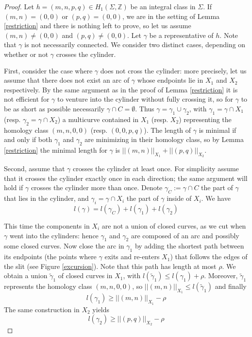 \documentclass{article}
\newcommand{\ZZ}{\mathbb{Z}}
\theoremstyle{definition}
\begin{document}
\begin{proof}
Let $h=(m,n,p,q)\in H_1(\Sigma,\ZZ)$ be an integral class in $\Sigma$. If $(m,n)=(0,0)$ or $(p,q)=(0,0)$, we are in the setting of Lemma \ref{restriction} and there is nothing left to prove, so let us assume $(m,n)\ne (0,0)$ and $(p,q)\ne (0,0)$. Let $\gamma$ be a representative of $h$. Note that $\gamma$ is not necessarily connected. We consider two distinct cases, depending on whether or not $\gamma$ crosses the cylinder. \newline \newline

First, consider the case where $\gamma$ does not cross the cylinder: more precisely, let us assume that there does not exist an arc of $\gamma$ whose endpoints lie in $X_1$ and $X_2$ respectively. By the same argument as in the proof of Lemma \ref{restriction} it is not efficient for $\gamma$ to venture into the cylinder without fully crossing it, so for $\gamma$ to be as short as possible necessarily $\gamma \cap C = \emptyset$. Thus $\gamma = \gamma_1 \cup \gamma_2$, with $\gamma_1=\gamma\cap X_1$ (resp. $\gamma_2=\gamma\cap X_2$) a multicurve contained in $X_1$ (resp. $X_2$) representing the homology class $(m,n,0,0)$ (resp. $(0,0,p,q)$). The length of $\gamma$ is minimal if and only if both $\gamma_1$ and $\gamma_2$ are minimizing in their homology class, so by Lemma \ref{restriction} the minimal length for $\gamma$ is $||(m,n)||_{X_1}+ ||(p,q)||_{X_2}$. \newline \newline

Second, assume that $\gamma$ crosses the cylinder at least once. For simplicity assume that it crosses the cylinder exactly once in each direction; the same argument will hold if $\gamma$ crosses the cylinder more than once. Denote $\gamma_C := \gamma \cap C$ the part of $\gamma$ that lies in the cylinder, and $\gamma_i = \gamma \cap X_i$ the part of $\gamma$ inside of $X_i$. We have $$l(\gamma)=l(\gamma_C)+l(\gamma_1)+l(\gamma_2)$$

This time the components in $X_i$ are not a union of closed curves, as we cut when $\gamma$ went into the cylinders: hence $\gamma_1$ and $\gamma_2$ are composed of an arc and possibly some closed curves. Now close the arc in $\gamma_1$ by adding the shortest path between its endpoints (the points where $\gamma$ exits and re-enters $X_1$) that follows the edges of the slit (see Figure \ref{excursion}). Note that this path has length at most $\rho$. We obtain a union $\tilde{\gamma}_1$ of closed curves in $X_1$, with $l(\tilde{\gamma}_1) \le l(\gamma_1) + \rho$. Moreover, $\tilde{\gamma}_1$ represents the homology class $(m,n,0,0)$, so $||(m,n)||_{X_1} \le l(\tilde{\gamma}_1)$ and finally $$l(\gamma_1) \ge ||(m,n)||_{X_1} - \rho$$
The same construction in $X_2$ yields $$l(\gamma_2) \ge ||(p,q)||_{X_2} - \rho$$




\end{proof}
\end{document}
